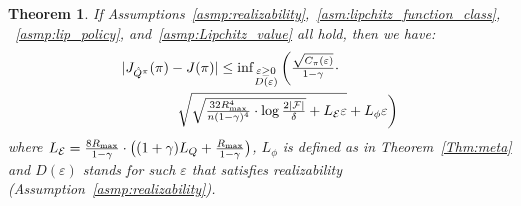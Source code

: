 \documentclass[twoside]{article}
\newtheorem{theorem}{Theorem}
\newcommand{\CAL}[1]{\mathcal{#1}}
\newcommand{\zyh}[1]{{\color{blue}{ [\textbf{Youheng:}} #1]}}
\begin{document}
\begin{theorem}\label{thm:final}
If Assumptions~\ref{asmp:realizability},~\ref{asm:lipchitz_function_class},%
~\ref{asmp:lip_policy}, and~\ref{asmp:Lipchitz_value} all hold, then we have:
\begin{align*}
&\textstyle |J_{\hat{Q}^\pi}(\pi)-J(\pi)|\leq\inf_{\substack{\varepsilon\geq 0\\D(\varepsilon)}}\bigg(\frac{\sqrt{C_\pi(\varepsilon)}}{1-\gamma}\cdot\\&\qquad\qquad\textstyle
        \sqrt{\sqrt{\frac{32R_{\rm max}^4}{n(1-\gamma)^4}\cdot\log\frac{2|\mathcal{F}|}{\delta}}+L_{\CAL{E}}\varepsilon}+L_\phi\varepsilon\bigg)
\end{align*}
where $L_\CAL{E}=\frac{8R_{\rm max}}{1-\gamma}\cdot\big((1+\gamma)L_Q+\frac{R_{\rm max}}{1-\gamma}\big)$, $L_\phi$ is defined as in Theorem~\ref{Thm:meta} and $D(\varepsilon)$ stands for such $\varepsilon$ that satisfies realizability (Assumption~\ref{asmp:realizability}).
\end{theorem}


\end{document}
